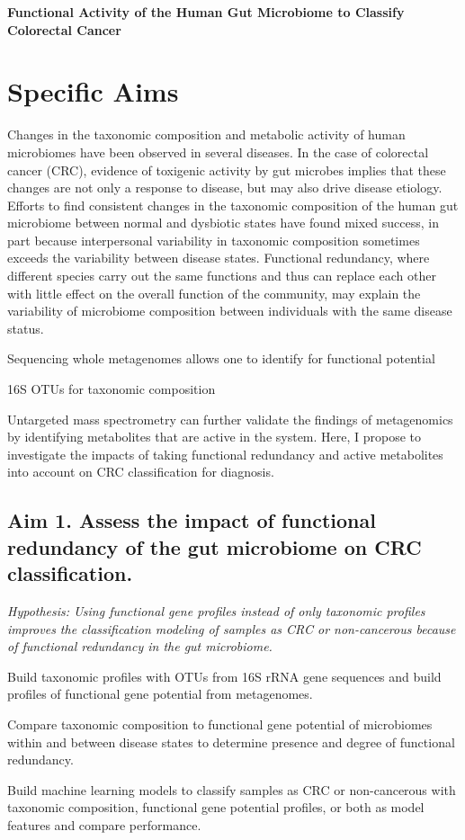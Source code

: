 \documentclass[12pt]{article}
\begin{document}
\sloppy
\begin{center}\large{\textbf{Functional Activity of the Human Gut Microbiome to Classify Colorectal Cancer}}\end{center}
\section*{Specific Aims}

Changes in the taxonomic composition and metabolic activity of human microbiomes have been observed in several diseases.
In the case of colorectal cancer (CRC), evidence of toxigenic activity by gut microbes implies that these changes are not only a response to disease, but may also drive disease etiology.
Efforts to find consistent changes in the taxonomic composition of the human gut microbiome between normal and dysbiotic states have found mixed success, in part because interpersonal variability in taxonomic composition sometimes exceeds the variability between disease states.
Functional redundancy, where different species carry out the same functions and thus can replace each other with little effect on the overall function of the community, may explain the variability of microbiome composition between individuals with the same disease status.

Sequencing whole metagenomes allows one to identify for functional potential

16S OTUs for taxonomic composition

Untargeted mass spectrometry can further validate the findings of metagenomics by identifying metabolites that are active in the system.
Here, I propose to investigate the impacts of taking functional redundancy and active metabolites into account on CRC classification for diagnosis.


\subsection*{Aim 1. Assess the impact of functional redundancy of the gut microbiome on CRC classification.}
\textit{Hypothesis: Using functional gene profiles instead of only taxonomic profiles improves the classification modeling of samples as CRC or non-cancerous because of functional redundancy in the gut microbiome.}
\begin{compactenum}[A.]
    \item Build taxonomic profiles with OTUs from 16S rRNA gene sequences and build profiles of functional gene potential from metagenomes.
    \item Compare taxonomic composition to functional gene potential of microbiomes within and between disease states to determine presence and degree of functional redundancy.
    \item Build machine learning models to classify samples as CRC or non-cancerous with taxonomic composition, functional gene potential profiles, or both as model features and compare performance.
\end{compactenum}
\end{document}
